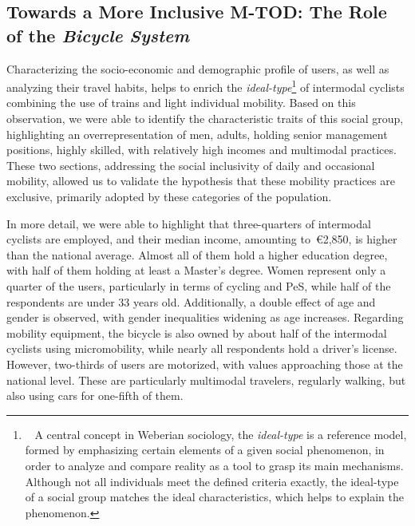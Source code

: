 \begin{refsegment}
\subsection*{Towards a More Inclusive M-TOD: The Role of the \textsl{Bicycle System}
    \label{chap4:principaux-enseignements-2}
    }

Characterizing the socio-economic and demographic profile of users, as well as analyzing their travel habits, helps to enrich the \textsl{ideal-type}\footnote{~
    A central concept in Weberian sociology, the \textsl{ideal-type} is a reference model, formed by emphasizing certain elements of a given social phenomenon, in order to analyze and compare reality as a tool to grasp its main mechanisms. Although not all individuals meet the defined criteria exactly, the ideal-type of a social group matches the ideal characteristics, which helps to explain the phenomenon.
} of intermodal cyclists combining the use of trains and light individual mobility. Based on this observation, we were able to identify the characteristic traits of this social group, highlighting an overrepresentation of men, adults, holding senior management positions, highly skilled, with relatively high incomes and multimodal practices. These two sections, addressing the social inclusivity of daily and occasional mobility, allowed us to validate the hypothesis that these mobility practices are exclusive, primarily adopted by these categories of the population.%

In more detail, we were able to highlight that three-quarters of intermodal cyclists are employed, and their median income, amounting to~\euro2,850, is higher than the national average. Almost all of them hold a higher education degree, with half of them holding at least a Master's degree. Women represent only a quarter of the users, particularly in terms of cycling and \acrshort{PeS}, while half of the respondents are under 33 years old. Additionally, a double effect of age and gender is observed, with gender inequalities widening as age increases. Regarding mobility equipment, the bicycle is also owned by about half of the intermodal cyclists using micromobility, while nearly all respondents hold a driver's license. However, two-thirds of users are motorized, with values approaching those at the national level. These are particularly multimodal travelers, regularly walking, but also using cars for one-fifth of them.%


\end{refsegment}
